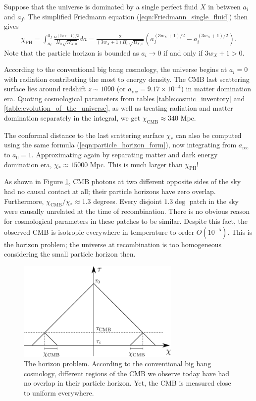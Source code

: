 Suppose that the universe is dominated by a single perfect fluid $X$ in between $a_i$ and $a_f$. The simplified Friedmann equation (\ref{eqn:Friedmann_single_fluid}) then gives
\begin{align}
	\chi_\text{PH} = \int_{a_i}^{a_f} \frac{a^{(3w_X - 1)/2}}{H_0 \sqrt{\Omega_{X,0}}} da = \frac{2}{(3w_X+1) H_0 \sqrt{\Omega_{X,0}}} \left( a_f^{(3w_X+1)/2} - a_i^{(3w_X+1)/2} \right). \label{eqn:particle_horizon_form}
\end{align}
Note that the particle horizon is bounded as $a_i \rightarrow 0$ if and only if $3w_X+1>0$.

According to the conventional big bang cosmology, the universe begins at $a_i=0$ with radiation contributing the most to energy density. The CMB last scattering surface lies around redshift $z \sim 1090$ (or $a_\text{rec}=9.17\times 10^{-4}$) in matter domination era. Quoting cosmological parameters from tables \ref{table:cosmic_inventory} and \ref{table:evolution_of_the_universe}, as well as treating radiation and matter domination separately in the integral, we get $\chi_\text{CMB} \approx 340$ Mpc.

The conformal distance to the last scattering surface $\chi_*$ can also be computed using the same formula (\ref{eqn:particle_horizon_form}), now integrating from $a_\text{rec}$ to $a_0=1$. Approximating again by separating matter and dark energy domination era, $\chi_* \approx 15000$ Mpc. This is much larger than $\chi_\text{PH}$!

As shown in Figure \ref{fig:horizon_problem}, CMB photons at two different opposite sides of the sky had no causal contact at all; their particle horizons have zero overlap. Furthermore, $\chi_\text{CMB}/\chi_* \approx 1.3$ degrees. Every disjoint $1.3\deg$ patch in the sky were causally unrelated at the time of recombination. There is no obvious reason for cosmological parameters in these patches to be similar. Despite this fact, the observed CMB is isotropic everywhere in temperature to order $O(10^{-5})$. This is the horizon problem; the universe at recombination is too homogeneous considering the small particle horizon then.
\begin{figure}[htbp!] 
	\centering    
	\includegraphics[width=0.7\textwidth]{horizon_problem.png}
	\caption{The horizon problem. According to the conventional big bang cosmology, different regions of the CMB we observe today have had no overlap in their particle horizon. Yet, the CMB is measured close to uniform everywhere.}
	\label{fig:horizon_problem}
\end{figure}

